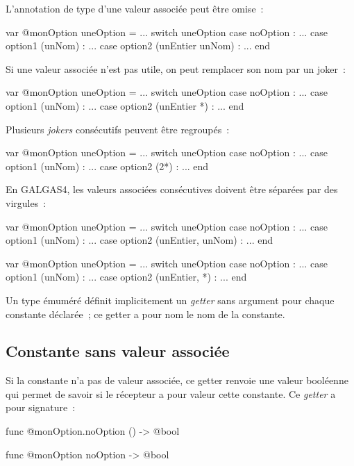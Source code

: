 L'annotation de type d'une valeur associée peut être omise~:

\begin{galgas3}
var @monOption uneOption = ...
switch uneOption
case noOption : ...
case option1 (unNom) : ...
case option2 (unEntier unNom) : ...
end
\end{galgas3}

Si une valeur associée n'est pas utile, on peut remplacer son nom par un joker~:
\begin{galgas3}
var @monOption uneOption = ...
switch uneOption
case noOption : ...
case option1 (unNom) : ...
case option2 (unEntier *) : ...
end
\end{galgas3}

Plusieurs \emph{jokers} consécutifs peuvent être regroupés~:

\begin{galgas3}
var @monOption uneOption = ...
switch uneOption
case noOption : ...
case option1 (unNom) : ...
case option2 (2*) : ...
end
\end{galgas3}

En GALGAS4, les valeurs associées consécutives doivent être séparées par des virgules~:

\begin{galgas4}
var @monOption uneOption = ...
switch uneOption
case noOption : ...
case option1 (unNom) : ...
case option2 (unEntier, unNom) : ...
end
\end{galgas4}

\begin{galgas4}
var @monOption uneOption = ...
switch uneOption
case noOption : ...
case option1 (unNom) : ...
case option2 (unEntier, *) : ...
end
\end{galgas4}







Un type émuméré définit implicitement un \emph{getter} sans argument pour chaque constante déclarée~; ce getter a pour nom le nom de la constante.

\subsection{Constante sans valeur associée}

Si la constante n'a pas de valeur associée, ce getter renvoie une valeur booléenne qui permet de savoir si le récepteur a pour valeur cette constante. Ce \emph{getter} a pour signature~:
\begin{galgas4}
func @monOption.noOption () -> @bool
\end{galgas4}
\begin{galgas3}
func @monOption noOption -> @bool
\end{galgas3}

